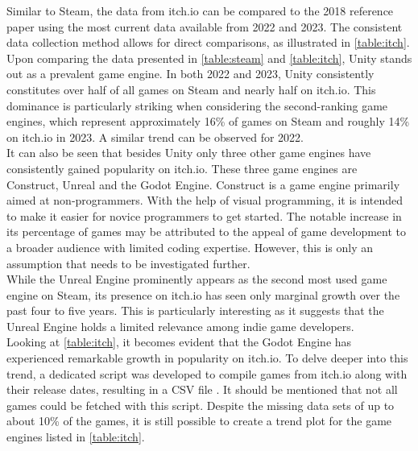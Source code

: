 Similar to Steam, the data from itch.io can be compared to the 2018 reference paper using the most current data available from 2022 and 2023.
The consistent data collection method allows for direct comparisons, as illustrated in \autoref{table:itch}.
Upon comparing the data presented in \autoref{table:steam} and \autoref{table:itch}, Unity stands out as a prevalent game engine.
In both 2022 and 2023, Unity consistently constitutes over half of all games on Steam and nearly half on itch.io.
This dominance is particularly striking when considering the second-ranking game engines, which represent approximately 16\% of games on Steam and roughly 14\% on itch.io in 2023.
A similar trend can be observed for 2022. \\

It can also be seen that besides Unity only three other game engines have consistently gained popularity on itch.io.
These three game engines are Construct, Unreal and the Godot Engine.
Construct is a game engine primarily aimed at non-programmers.
With the help of visual programming, it is intended to make it easier for novice programmers to get started.
The notable increase in its percentage of games may be attributed to the appeal of game development to a broader audience with limited coding expertise.
However, this is only an assumption that needs to be investigated further. \\

While the Unreal Engine prominently appears as the second most used game engine on Steam, its presence on itch.io has seen only marginal growth over the past four to five years.
This is particularly interesting as it suggests that the Unreal Engine holds a limited relevance among indie game developers. \\

Looking at \autoref{table:itch}, it becomes evident that the Godot Engine has experienced remarkable growth in popularity on itch.io.
To delve deeper into this trend, a dedicated script was developed to compile games from itch.io along with their release dates, resulting in a CSV file \cite{github-trend-itch}.
It should be mentioned that not all games could be fetched with this script.
Despite the missing data sets of up to about 10\% of the games, it is still possible to create a trend plot for the game engines listed in \autoref{table:itch}.

